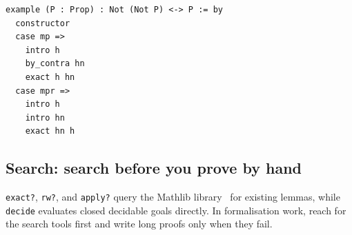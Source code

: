 \begin{lstlisting}
example (P : Prop) : Not (Not P) <-> P := by
  constructor
  case mp =>
    intro h
    by_contra hn
    exact h hn
  case mpr =>
    intro h
    intro hn
    exact hn h
\end{lstlisting}

\subsection{Search: search before you prove by hand}
\texttt{exact?}, \texttt{rw?}, and \texttt{apply?} query the Mathlib
library~\cite{Mathlib2020} for existing lemmas, while \texttt{decide}
evaluates closed decidable goals directly. In formalisation work, reach for
the search tools first and write long proofs only when they fail.

